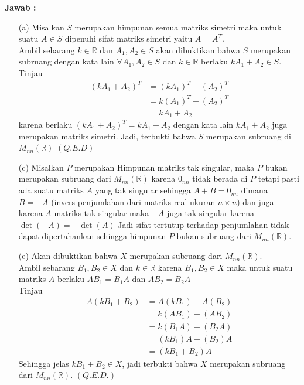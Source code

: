 \documentclass[11pt,a4paper]{article}
\theoremstyle{plain}
\theoremstyle{definition}
\theoremstyle{remark}
\begin{document}
\begin{enumerate}
\begin{enumerate}
		\textbf{Jawab :}
		
		\begin{enumerate}
			\item[(a)] Misalkan $S$ merupakan himpunan semua matriks simetri maka untuk suatu $A\in S$ dipenuhi sifat matriks simetri yaitu $A=A^{T}$.\\
			Ambil sebarang $k\in \mathbb{R}$ dan $A_{1}, A_{2}\in S$ akan dibuktikan bahwa $S$ merupakan subruang dengan kata lain $\forall A_{1}, A_{2}\in S$ dan $k\in \mathbb{R}$ berlaku $kA_{1}+A_{2}\in S$.\\
			Tinjau
			\begin{align*}
			(kA_{1}+A_{2})^{T} &= (kA_{1})^{T}+(A_{2})^{T} \\
			&= k(A_{1})^{T}+(A_{2})^{T} \\
			&= kA_{1}+A_{2}
			\end{align*}
			karena berlaku $(kA_{1}+A_{2})^{T}=kA_{1}+A_{2}$ dengan kata lain $kA_{1}+A_{2}$ juga merupakan matriks simetri. Jadi, terbukti bahwa $S$ merupakan subruang di $M_{nn}(\mathbb{R})$ $(Q.E.D)$
			\item[(c)] Misalkan $P$ merupakan Himpunan matriks tak singular, maka $P$ bukan merupakan subruang dari $M_{nn}(\mathbb{R})$ karena $0_{nn}$ tidak berada di $P$ tetapi pasti ada suatu matriks $A$ yang tak singular sehingga $A+B=0_{nn}$ dimana $B=-A$ (invers penjumlahan dari matriks real ukuran $n\times n$) dan juga karena $A$ matriks tak singular maka $-A$ juga tak singular karena $\det(-A)=-\det(A)$ Jadi sifat tertutup terhadap penjumlahan tidak dapat dipertahankan sehingga himpunan $P$ bukan subruang dari $M_{nn}(\mathbb{R})$.
			\item[(e)] Akan dibuktikan bahwa $X$ merupakan subruang dari $M_{nn}(\mathbb{R})$.\\
			Ambil sebarang $B_{1},B_{2}\in X$ dan $k\in \mathbb{R}$ karena $B_{1},B_{2}\in X$ maka untuk suatu matriks $A$ berlaku $AB_{1}=B_{1}A$ dan $AB_{2}=B_{2}A$ \\
			Tinjau
			\begin{align*}
			A(kB_{1}+B_{2}) &= A(kB_{1})+A(B_{2}) \\
			&= k(AB_{1})+(AB_{2}) \\
			&= k(B_{1}A)+(B_{2}A) \\
			&= (kB_{1})A+(B_{2})A \\
			&= (kB_{1}+B_{2})A 
			\end{align*}	
			Sehingga jelas $kB_{1}+B_{2}\in X$, jadi terbukti bahwa $X$ merupakan subruang dari $M_{nn}(\mathbb{R})$. $(Q.E.D.)$

\end{enumerate}
\end{enumerate}
\end{enumerate}
\end{document}
